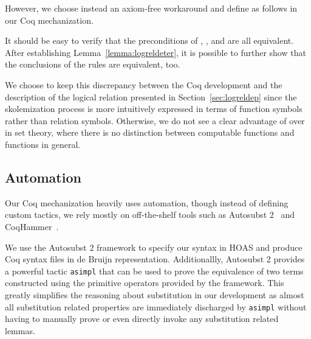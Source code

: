 \documentclass[acmsmall,screen=true,
\ifpublic review=false\else,review=true\fi
  ,anonymous=\ifanonymous true\else false\fi]{acmart}
\newcommand{\scw}[1]{}
\begin{document}
However, we choose instead an axiom-free workaround and define
 as follows in our Coq mechanization.
\begin{center}
\end{center}
It should be easy to verify that the preconditions of
, , and  are all
equivalent. After establishing Lemma~\ref{lemma:logreldeter}, it is
possible to further show that the conclusions of the rules are
equivalent, too.\scw{If it is easy, you should have already done it.
Unless it is really long and boring.}

We choose to keep this discrepancy between the Coq development and the
description of the logical relation presented in Section~\ref{sec:logreldep} since the
skolemization process is more intuitively expressed in terms of
function symbols rather than relation symbols. Otherwise, we do not
see a clear advantage of  over  in set
theory, where there is no distinction between computable functions and
functions in general. \scw{not sure I follow this last bit}

\subsection{Automation}
\label{sec:automation}
Our Coq mechanization heavily uses automation, though instead of
defining custom tactics, we rely mostly on off-the-shelf tools such as
Autosubst 2~\citep{autosubst2} and CoqHammer~\citep{czajka2018hammer}.

We use the Autosubst 2 framework to specify our syntax in HOAS and
produce Coq syntax files in de Bruijn representation. Additionallly,
Autosubst 2 provides a powerful tactic \texttt{asimpl} that
can be used to prove the equivalence of two terms constructed using
the primitive operators provided by the framework. This greatly
simplifies the reasoning about substitution in our development as
almost all substitution related properties are immediately discharged
by \texttt{asimpl} without having to manually prove or even directly invoke any
substitution related lemmas. \scw{You are only referring to lemmas about
how substitution relates to syntax, right? You still need to manually
invoke lemmas about substitution and judgements.}
\end{document}
